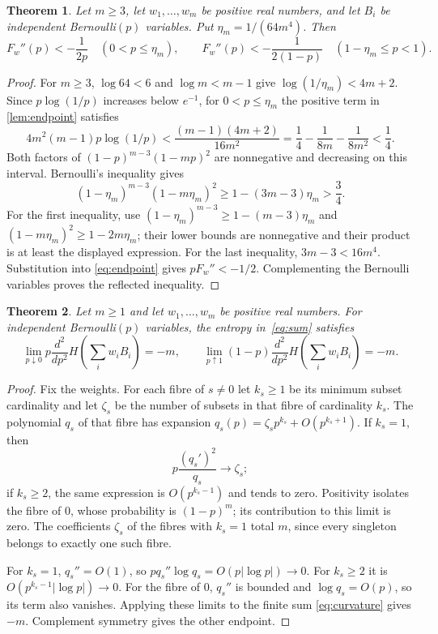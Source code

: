 \documentclass[11pt,a4paper]{article}
\numberwithin{equation}{section}
\newtheorem{theorem}{Theorem}[section]
\theoremstyle{remark}
\begin{document}
\begin{theorem}\label{thm:allendpoint}
Let $m\ge3$, let $w_1,\ldots,w_m$ be positive real numbers, and let $B_i$ be independent Bernoulli$(p)$ variables. Put $\eta_m=1/(64m^4)$. Then
\[
 F_w''(p)<-\frac1{2p}\quad(0<p\le\eta_m),\qquad
 F_w''(p)<-\frac1{2(1-p)}\quad(1-\eta_m\le p<1).
\]
\end{theorem}
\begin{proof}
For $m\ge3$, $\log64<6$ and $\log m<m-1$ give
$\log(1/\eta_m)<4m+2$. Since $p\log(1/p)$ increases below $e^{-1}$, for $0<p\le\eta_m$ the positive term in \cref{lem:endpoint} satisfies
\[
 4m^2(m-1)p\log(1/p)
 <\frac{(m-1)(4m+2)}{16m^2}
 =\frac14-\frac1{8m}-\frac1{8m^2}<\frac14.
\]
Both factors of $(1-p)^{m-3}(1-mp)^2$ are nonnegative and decreasing on this interval. Bernoulli's inequality gives
\[
 (1-\eta_m)^{m-3}(1-m\eta_m)^2
 \ge 1-(3m-3)\eta_m>\frac34.
\]
For the first inequality, use $(1-\eta_m)^{m-3}\ge1-(m-3)\eta_m$ and $(1-m\eta_m)^2\ge1-2m\eta_m$; their lower bounds are nonnegative and their product is at least the displayed expression. For the last inequality, $3m-3<16m^4$. Substitution into \eqref{eq:endpoint} gives $pF_w''<-1/2$. Complementing the Bernoulli variables proves the reflected inequality.
\end{proof}

\begin{theorem}\label{thm:limit}
Let $m\ge1$ and let $w_1,\ldots,w_m$ be positive real numbers. For independent Bernoulli$(p)$ variables, the entropy in~\eqref{eq:sum} satisfies
\[
 \lim_{p\downarrow0}p\frac{d^2}{dp^2}H\!\left(\sum_iw_iB_i\right)=-m,
 \qquad
 \lim_{p\uparrow1}(1-p)\frac{d^2}{dp^2}H\!\left(\sum_iw_iB_i\right)=-m.
\]
\end{theorem}
\begin{proof}
Fix the weights. For each fibre of $s\ne0$ let $k_s\ge1$ be its minimum subset cardinality and let $\zeta_s$ be the number of subsets in that fibre of cardinality $k_s$. The polynomial $q_s$ of that fibre has expansion
$q_s(p)=\zeta_sp^{k_s}+O(p^{k_s+1})$. If $k_s=1$, then
\[
 p\frac{(q_s')^2}{q_s}\to \zeta_s;
\]
if $k_s\ge2$, the same expression is $O(p^{k_s-1})$ and tends to zero. Positivity isolates the fibre of $0$, whose probability is $(1-p)^m$; its contribution to this limit is zero. The coefficients $\zeta_s$ of the fibres with $k_s=1$ total $m$, since every singleton belongs to exactly one such fibre.

For $k_s=1$, $q_s''=O(1)$, so $pq_s''\log q_s=O(p|\log p|)\to0$. For $k_s\ge2$ it is $O(p^{k_s-1}|\log p|)\to0$. For the fibre of $0$, $q_s''$ is bounded and $\log q_s=O(p)$, so its term also vanishes. Applying these limits to the finite sum \eqref{eq:curvature} gives $-m$. Complement symmetry gives the other endpoint.
\end{proof}
\end{document}
